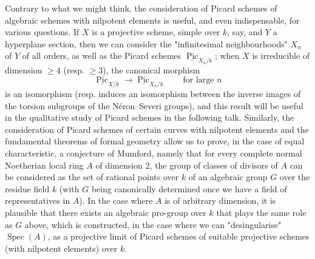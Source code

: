 \begin{remark}\label{fga3.v-6-remark-6.8}
    Contrary to what we might think, the consideration of Picard schemes of algebraic schemes with nilpotent elements is useful, and even indispensable, for various questions.
    If $X$ is a projective scheme, simple over $k$, say, and $Y$ a hyperplane section, then we can consider the "infinitesimal neighbourhoods" $X_n$ of $Y$ of all orders, as well as the Picard schemes $\underline{\operatorname{Pic}}_{X_n/k}$;
    when $X$ is irreducible of dimension $\geqslant4$ (resp. $\geqslant3$), the canonical morphism
    \[
        \underline{\operatorname{Pic}}_{X/k}
        \to\underline{\operatorname{Pic}}_{X_n/k}
        \qquad\text{for large }n
    \]
    is an isomorphism (resp. induces an isomorphism between the inverse images of the torsion subgroups of the Néron–Severi groups), and this result will be useful in the qualitative study of Picard schemes in the following talk.
    Similarly, the consideration of Picard schemes of certain curves with nilpotent elements and the fundamental theorems of formal geometry \cite{Gro1958} allow us to prove, in the case of equal characteristic, a conjecture of Mumford, namely that for every complete normal Noetherian local ring $A$ of dimension $2$, the group of classes of divisors of $A$ can be considered as the set of rational points over $k$ of an algebraic group $G$ over the residue field $k$ (with $G$ being canonically determined once we have a field of representatives in $A$).
    In the case where $A$ is of arbitrary dimension, it is plausible that there exists an algebraic pro-group over $k$ that plays the same role as $G$ above, which is constructed, in the case where we can "desingularise" $\operatorname{Spec}(A)$, as a projective limit of Picard schemes of suitable projective schemes (with nilpotent elements) over $k$.
\end{remark}